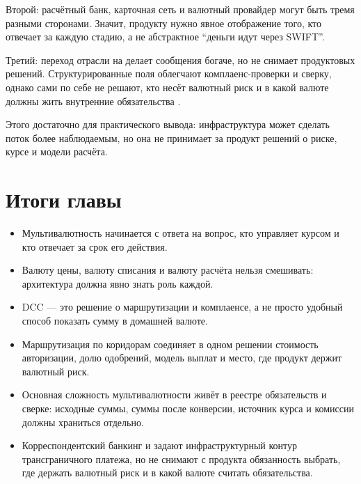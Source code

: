 Второй: расчётный банк, карточная сеть и валютный провайдер
могут быть тремя разными сторонами. Значит, продукту нужно
явное отображение того, кто отвечает за каждую стадию,
а не абстрактное \enquote{деньги идут через SWIFT}.

Третий: переход отрасли на  делает сообщения богаче,
но не снимает продуктовых решений. Структурированные поля
облегчают комплаенс-проверки и сверку, однако сами по себе
не решают, кто несёт валютный риск и в какой валюте должны
жить внутренние обязательства
\cite{iso-20022,swift-iso20022-milestone,swift-transaction-manager-iso20022}.

Этого достаточно для практического вывода: инфраструктура
может сделать поток более наблюдаемым, но она не принимает
за продукт решений о риске, курсе и модели расчёта.

\section*{Итоги главы}
\begin{itemize}
  \item Мультивалютность начинается с ответа на вопрос,
        кто управляет курсом и кто отвечает за срок его действия.
  \item Валюту цены, валюту списания и валюту расчёта нельзя
        смешивать: архитектура должна явно знать роль каждой.
  \item DCC --- это решение о маршрутизации и комплаенсе,
        а не просто удобный способ показать сумму
        в домашней валюте.
  \item Маршрутизация по коридорам соединяет в одном решении
        стоимость авторизации, долю одобрений, модель выплат
        и место, где продукт держит валютный риск.
  \item Основная сложность мультивалютности живёт в реестре
        обязательств и сверке: исходные суммы, суммы после конверсии,
        источник курса и комиссии должны храниться отдельно.
  \item Корреспондентский банкинг и  задают
        инфраструктурный контур трансграничного платежа,
        но не снимают с продукта обязанность выбрать,
        где держать валютный риск и в какой валюте считать
        обязательства.
\end{itemize}
